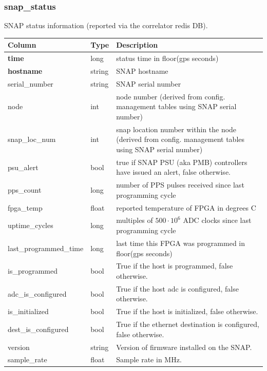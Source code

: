 \documentclass{article}
\begin{document}
{\subsubsection{snap\_status}
SNAP status information (reported via the correlator redis DB).
\begin{center}
 \begin{tabular}{| p{4cm} | p{2cm} | p{10cm} |}
\hline
 {\bf Column} & {\bf Type}  & {\bf Description} \\ [0.5ex]  \hline\hline
\textbf{time} & long & status time in floor(gps seconds)\\ \hline
\textbf{hostname} & string & SNAP hostname \\ \hline
serial\_number & string & SNAP serial number \\ \hline
node & int & node number (derived from config. management tables using SNAP serial number) \\ \hline
snap\_loc\_num & int & snap location number within the node (derived from config. management tables using SNAP serial number) \\ \hline
psu\_alert & bool & true if SNAP PSU (aka PMB) controllers have issued an alert, false otherwise. \\ \hline
pps\_count & long & number of PPS pulses received since last programming cycle \\\hline
fpga\_temp & float & reported temperature of FPGA  in degrees C \\\hline
uptime\_cycles & long & multiples of $500\cdot 10^6$ ADC clocks since last programming cycle \\\hline
last\_programmed\_time & long & last time this FPGA was programmed in floor(gps seconds)\\\hline
is\_programmed & bool & True if the host is programmed, false otherwise. \\ \hline
adc\_is\_configured & bool & True if the host adc is configured, false otherwise. \\ \hline
is\_initialized & bool & True if the host is initialized, false otherwise. \\ \hline
dest\_is\_configured & bool & True if the ethernet destination is configured, false otherwise. \\ \hline
version & string & Version of firmware installed on the SNAP. \\ \hline
sample\_rate & float & Sample rate in MHz. \\\hline
\end{tabular}
\end{center}

}
\end{document}

